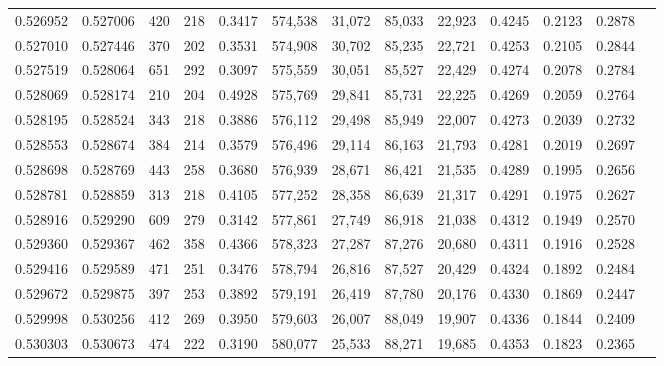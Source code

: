 \begin{tabular}{rrrrrrrrrrrrr}
0.526952 & 0.527006 &    420 &   218 &                                     0.3417 & 574,538 &  31,072 &  85,033 &  22,923 & 0.4245 & 0.2123 & 0.2878 \\
0.527010 & 0.527446 &    370 &   202 &                                     0.3531 & 574,908 &  30,702 &  85,235 &  22,721 & 0.4253 & 0.2105 & 0.2844 \\
0.527519 & 0.528064 &    651 &   292 &                                     0.3097 & 575,559 &  30,051 &  85,527 &  22,429 & 0.4274 & 0.2078 & 0.2784 \\
0.528069 & 0.528174 &    210 &   204 &                                     0.4928 & 575,769 &  29,841 &  85,731 &  22,225 & 0.4269 & 0.2059 & 0.2764 \\
0.528195 & 0.528524 &    343 &   218 &                                     0.3886 & 576,112 &  29,498 &  85,949 &  22,007 & 0.4273 & 0.2039 & 0.2732 \\
0.528553 & 0.528674 &    384 &   214 &                                     0.3579 & 576,496 &  29,114 &  86,163 &  21,793 & 0.4281 & 0.2019 & 0.2697 \\
0.528698 & 0.528769 &    443 &   258 &                                     0.3680 & 576,939 &  28,671 &  86,421 &  21,535 & 0.4289 & 0.1995 & 0.2656 \\
0.528781 & 0.528859 &    313 &   218 &                                     0.4105 & 577,252 &  28,358 &  86,639 &  21,317 & 0.4291 & 0.1975 & 0.2627 \\
0.528916 & 0.529290 &    609 &   279 &                                     0.3142 & 577,861 &  27,749 &  86,918 &  21,038 & 0.4312 & 0.1949 & 0.2570 \\
0.529360 & 0.529367 &    462 &   358 &                                     0.4366 & 578,323 &  27,287 &  87,276 &  20,680 & 0.4311 & 0.1916 & 0.2528 \\
0.529416 & 0.529589 &    471 &   251 &                                     0.3476 & 578,794 &  26,816 &  87,527 &  20,429 & 0.4324 & 0.1892 & 0.2484 \\
0.529672 & 0.529875 &    397 &   253 &                                     0.3892 & 579,191 &  26,419 &  87,780 &  20,176 & 0.4330 & 0.1869 & 0.2447 \\
0.529998 & 0.530256 &    412 &   269 &                                     0.3950 & 579,603 &  26,007 &  88,049 &  19,907 & 0.4336 & 0.1844 & 0.2409 \\
0.530303 & 0.530673 &    474 &   222 &                                     0.3190 & 580,077 &  25,533 &  88,271 &  19,685 & 0.4353 & 0.1823 & 0.2365 \\

\end{tabular}

